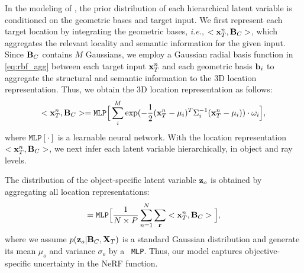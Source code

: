 In the modeling of {\method{}}, the prior distribution of each hierarchical latent variable is conditioned on the geometric bases and target input. 
We first represent each target location by integrating the geometric bases, \textit{i.e.}, $<{\bf{x}}_{T}^{n}, {\bf{B}}_C >$, which aggregates the relevant locality and semantic information for the given input. 
Since ${\bf{B}}_{C}$ contains $M$ Gaussians, we employ a Gaussian radial basis function in \cref{eq:rbf_agg} between each target input ${\bf{x}}_{T}^{ n}$ and each geometric basis ${\bf{b}}_i$ to aggregate the structural and semantic information to the 3D location representation. Thus, we obtain the 3D location representation as follows:
\begin{equation}
\label{eq:rbf_agg}
    <{\bf{x}}_{T}^{n}, {\bf{B}}_C > = \texttt{MLP}\Big[\sum_i^{M} \exp (-\frac{1}{2}({\bf{x}}_{T}^{n}-\mu_i)^T\Sigma_i^{-1}({\bf{x}}_{T}^{n}-\mu_i) ) \cdot \omega_i\Big],
\end{equation} 
where $\texttt{MLP}[\cdot]$ is a learnable neural network.
With the location representation $<{\bf{x}}_{T}^{n}, {\bf{B}}_C >$, we next infer each latent variable hierarchically, in object and ray levels. 

 The distribution of the object-specific latent variable ${\bf{z}}_o$ is obtained by aggregating all location representations:
\begin{equation}
    [\mu_{{o}}, \sigma_{{o}}] 
    = \texttt{MLP}\Big[\frac{1}{N \times P}\sum_{n = 1}^{N}\sum_{\mathbf{r}}
    <{\bf{x}}_{T}^{n}, {\bf{B}}_C >\Big],
\end{equation} 
where we assume $p({\bf{z}}_o | {\bf{B}}_C,  {\bf{X}}_T)$ is a standard Gaussian distribution and generate its mean $\mu_{o}$ and variance $\sigma_{o}$ by a ~\texttt{MLP}. 
Thus, our model captures objective-specific uncertainty in the NeRF function.



